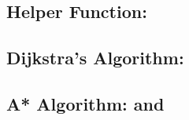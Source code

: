 \documentclass[]{../ncmathy}
\begin{document}
	\subsection{Helper Function: }
		
	
	\subsection{Dijkstra's Algorithm: }
		
		
	\subsection{A* Algorithm:  and }
		
		
\end{document}
